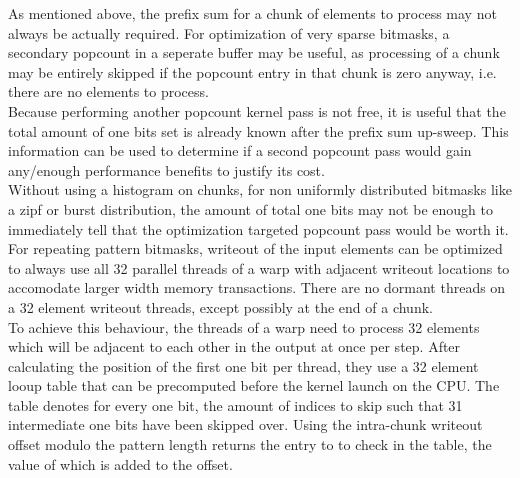 \documentclass{tudscrreprt}
\begin{document}
			As mentioned above, the prefix sum for a chunk of elements to process may not always be actually required. For optimization of very sparse bitmasks, a secondary popcount in a seperate buffer may be useful, as processing of a chunk may be entirely skipped if the popcount entry in that chunk is zero anyway, i.e. there are no elements to process. \\
			Because performing another popcount kernel pass is not free, it is useful that the total amount of one bits set is already known after the prefix sum up-sweep. This information can be used to determine if a second popcount pass would gain any/enough performance benefits to justify its cost. \\
			Without using a histogram on chunks, for non uniformly distributed bitmasks like a zipf or burst distribution, the amount of total one bits may not be enough to immediately tell that the optimization targeted popcount pass would be worth it. \\
			
			For repeating pattern bitmasks, writeout of the input elements can be optimized to always use all 32 parallel threads of a warp with adjacent writeout locations to accomodate larger width memory transactions. There are no dormant threads on a 32 element writeout threads, except possibly at the end of a chunk. \\
			To achieve this behaviour, the threads of a warp need to process 32 elements which will be adjacent to each other in the output at once per step. After calculating the position of the first one bit per thread, they use a 32 element looup table that can be precomputed before the kernel launch on the CPU. The table denotes for every one bit, the amount of indices to skip such that 31 intermediate one bits have been skipped over. Using the intra-chunk writeout offset modulo the pattern length returns the entry to to check in the table, the value of which is added to the offset. \\
		
\end{document}
